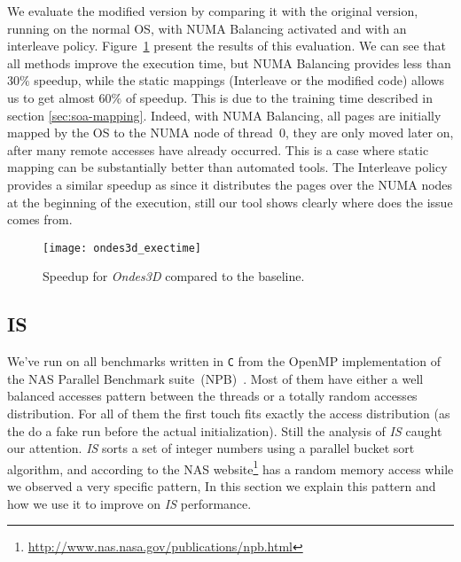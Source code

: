 We evaluate the modified version by comparing it with the original
version, running on the normal OS, with NUMA Balancing activated and with an
interleave policy. Figure~\ref{fig:ondes-res} present the results of this
evaluation. We can see that all methods improve the execution time, but
NUMA Balancing provides less than $30\%$ speedup, while the static mappings
(Interleave or the modified code) allows us to get almost $60\%$ of speedup. This is
due to the training time described in section \ref{sec:soa-mapping}. Indeed,
with NUMA Balancing, all pages are initially mapped by the OS to the NUMA node
of thread~$0$, they
are only moved later on, after many remote accesses have already occurred. This is a case where static mapping can be substantially better than automated
tools. The Interleave policy provides a similar speedup as
\TABARNAC since it distributes the pages over the NUMA nodes at the beginning of
the execution, still our tool shows clearly where does the issue comes from.

\begin{figure}[htb]
    \centering
    \texttt{[image: ondes3d\_exectime]}
    \caption{Speedup for \emph{Ondes3D} compared to the baseline.}
    \label{fig:ondes-res}
\end{figure}

\subsection{IS}
\label{sec:exp-is}


We've run \TABARNAC on all benchmarks written in \texttt{C} from the OpenMP
implementation of the NAS Parallel Benchmark suite~(NPB)~\cite{Jin1999}. Most
of them have either a well balanced accesses pattern between the threads or a
totally random accesses distribution. For all of them the first touch fits exactly
the access distribution (as the do a fake run before the actual
initialization). Still the analysis of \emph{IS} caught our attention.
\emph{IS} sorts a set of integer numbers using a parallel bucket sort
algorithm, and according to the NAS
website\footnote{\url{http://www.nas.nasa.gov/publications/npb.html}} has a
random memory access while we observed a very specific pattern, In this
section we explain this pattern and how we use it to improve on \emph{IS}
performance.

